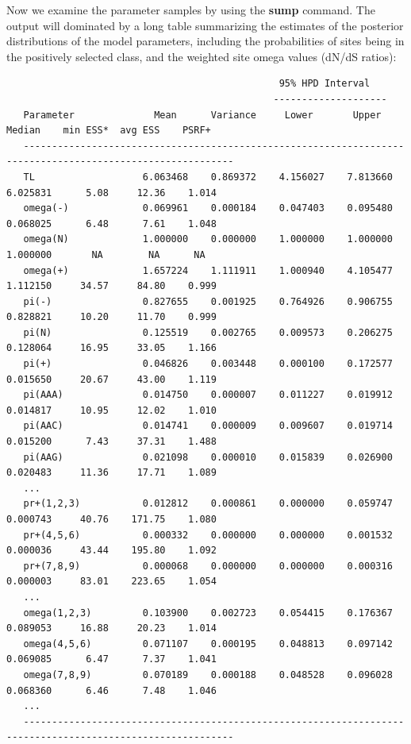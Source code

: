 \documentclass[12pt]{book}
\begin{document}
Now we examine the parameter samples by using the \textbf{sump} command. The output will dominated
by a long table summarizing the estimates of the posterior distributions of the model parameters,
including the probabilities of sites being in the positively selected class, and the weighted site
omega values (dN/dS ratios):


\begin{singlespacing}
\tiny
\begin{verbatim}
                                                95% HPD Interval
                                               --------------------
   Parameter              Mean      Variance     Lower       Upper       Median    min ESS*  avg ESS    PSRF+ 
   -----------------------------------------------------------------------------------------------------------
   TL                   6.063468    0.869372    4.156027    7.813660    6.025831      5.08     12.36    1.014
   omega(-)             0.069961    0.000184    0.047403    0.095480    0.068025      6.48      7.61    1.048
   omega(N)             1.000000    0.000000    1.000000    1.000000    1.000000       NA        NA      NA   
   omega(+)             1.657224    1.111911    1.000940    4.105477    1.112150     34.57     84.80    0.999
   pi(-)                0.827655    0.001925    0.764926    0.906755    0.828821     10.20     11.70    0.999
   pi(N)                0.125519    0.002765    0.009573    0.206275    0.128064     16.95     33.05    1.166
   pi(+)                0.046826    0.003448    0.000100    0.172577    0.015650     20.67     43.00    1.119
   pi(AAA)              0.014750    0.000007    0.011227    0.019912    0.014817     10.95     12.02    1.010
   pi(AAC)              0.014741    0.000009    0.009607    0.019714    0.015200      7.43     37.31    1.488
   pi(AAG)              0.021098    0.000010    0.015839    0.026900    0.020483     11.36     17.71    1.089
   ...
   pr+(1,2,3)           0.012812    0.000861    0.000000    0.059747    0.000743     40.76    171.75    1.080
   pr+(4,5,6)           0.000332    0.000000    0.000000    0.001532    0.000036     43.44    195.80    1.092
   pr+(7,8,9)           0.000068    0.000000    0.000000    0.000316    0.000003     83.01    223.65    1.054
   ...
   omega(1,2,3)         0.103900    0.002723    0.054415    0.176367    0.089053     16.88     20.23    1.014
   omega(4,5,6)         0.071107    0.000195    0.048813    0.097142    0.069085      6.47      7.37    1.041
   omega(7,8,9)         0.070189    0.000188    0.048528    0.096028    0.068360      6.46      7.48    1.046
   ...
   -----------------------------------------------------------------------------------------------------------

\end{verbatim}
\normalsize
\end{singlespacing}
\end{document}
